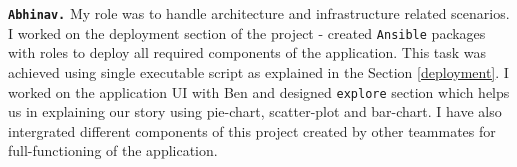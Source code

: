 \textbf{\texttt{Abhinav.} }
My role was to handle architecture and infrastructure related scenarios. I worked on the deployment section of the project - created \texttt{Ansible} packages with roles to deploy all required components of the application. This task was achieved using single executable script as explained in the Section \ref{deployment}. I worked on the application UI with Ben and designed \texttt{explore} section which helps us in explaining our story using pie-chart, scatter-plot and bar-chart. I have also intergrated different components of this project created by other teammates for full-functioning of the application.